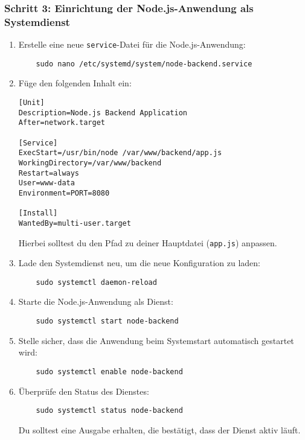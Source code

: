 \documentclass[a4paper,12pt]{article}
\begin{document}
\subsubsection{Schritt 3: Einrichtung der Node.js-Anwendung als Systemdienst}
\begin{enumerate}
    \item Erstelle eine neue \texttt{service}-Datei für die Node.js-Anwendung:

    \begin{lstlisting}
    sudo nano /etc/systemd/system/node-backend.service
    \end{lstlisting}
    
    \item Füge den folgenden Inhalt ein:
    
    \begin{lstlisting}
[Unit]
Description=Node.js Backend Application
After=network.target

[Service]
ExecStart=/usr/bin/node /var/www/backend/app.js
WorkingDirectory=/var/www/backend
Restart=always
User=www-data
Environment=PORT=8080

[Install]
WantedBy=multi-user.target
    \end{lstlisting}
    
    Hierbei solltest du den Pfad zu deiner Hauptdatei (\texttt{app.js}) anpassen.

    \item Lade den Systemdienst neu, um die neue Konfiguration zu laden:

    \begin{lstlisting}
    sudo systemctl daemon-reload
    \end{lstlisting}
    
    \item Starte die Node.js-Anwendung als Dienst:

    \begin{lstlisting}
    sudo systemctl start node-backend
    \end{lstlisting}
    
    \item Stelle sicher, dass die Anwendung beim Systemstart automatisch gestartet wird:

    \begin{lstlisting}
    sudo systemctl enable node-backend
    \end{lstlisting}
    
    \item Überprüfe den Status des Dienstes:

    \begin{lstlisting}
    sudo systemctl status node-backend
    \end{lstlisting}
    
    Du solltest eine Ausgabe erhalten, die bestätigt, dass der Dienst aktiv läuft.
\end{enumerate}
\end{document}
